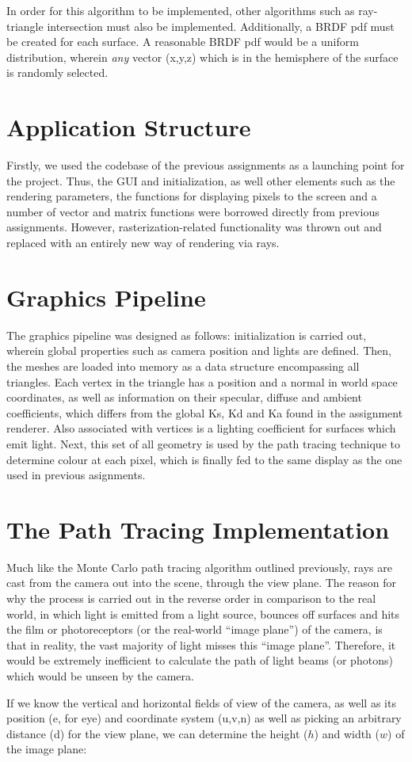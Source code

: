 \documentclass[12pt,journal]{IEEEtran}
\begin{document}
\newpage

In order for this algorithm to be implemented, other algorithms such as ray-triangle intersection must also be implemented. 
Additionally, a BRDF pdf must be created for each surface. A reasonable BRDF pdf would be a uniform distribution, wherein \emph{any} 
vector (x,y,z) which is in the hemisphere of the surface is randomly selected.

\section{Application Structure}
Firstly, we used the codebase of the previous assignments as a launching point for the project. Thus, the GUI and initialization, as well other elements such as the rendering parameters, the functions for displaying pixels to the screen and a number of vector and matrix functions were borrowed directly from previous assignments. However, rasterization-related functionality was thrown out and replaced with an entirely new way of rendering via rays.

\section{Graphics Pipeline}
The graphics pipeline was designed as follows: initialization is carried out, wherein global properties such as camera position and lights are defined. Then, the meshes are loaded into memory as a data structure encompassing all triangles. Each vertex in the triangle has a position and a normal in world space coordinates, as well as information on their specular, diffuse and ambient coefficients, which differs from the global Ks, Kd and Ka found in the assignment renderer. Also associated with vertices is a lighting coefficient for surfaces which emit light. Next, this set of all geometry is used by the path tracing technique to determine colour at each pixel, which is finally fed to the same display as the one used in previous asignments.

\section{The Path Tracing Implementation}
Much like the Monte Carlo path tracing algorithm outlined previously, rays are cast from the camera out into the scene, through the view plane. The reason for why the process is carried out in the reverse order in comparison to the real world, in which light is emitted from a light source, bounces off surfaces and hits the film or photoreceptors (or the real-world ``image plane'') of the camera, is that in reality, the vast majority of light misses this ``image plane''. Therefore, it would be extremely inefficient to calculate the path of light beams (or photons) which would be unseen by the camera.
\par
If we know the vertical and horizontal fields of view of the camera, as well as its position (e, for eye) and coordinate system (u,v,n) as well as picking an arbitrary distance (d) for the view plane, we can determine the height ($h$) and width ($w$) of the image plane:
\end{document}
